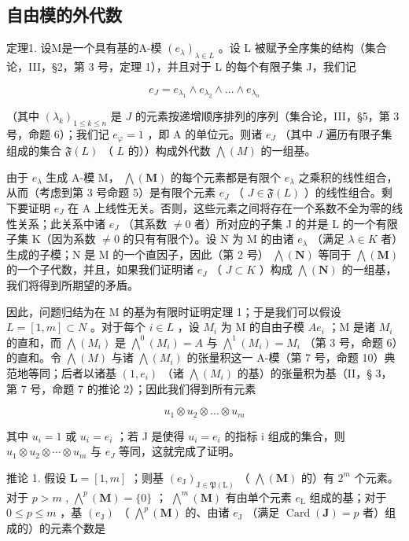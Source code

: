 \subsection{自由模的外代数}

定理1. 设M是一个具有基的A-模 \((e_{\lambda})_{\lambda \in L}\) 。设 L 被赋予全序集的结构（集合论，III，§2，第 3 号，定理 1），并且对于 L 的每个有限子集 J，我们记

\[
e _ {J} = e _ {\lambda_ {1}} \wedge e _ {\lambda_ {2}} \wedge \dots \wedge e _ {\lambda_ {n}}\tag{18}
\]

（其中 \((\lambda_k)_{1 \leqslant k \leqslant n}\) 是 \(J\) 的元素按递增顺序排列的序列（集合论，III，§5，第 3 号，命题 6）；我们记 \(e_\varphi = 1\) ，即 A 的单位元。则诸 \(e_J\) （其中 \(J\) 遍历有限子集组成的集合 \(\mathfrak{F}(L)\) （ \(L\) 的））构成外代数 \(\bigwedge(M)\) 的一组基。

由于 \(e_{\lambda}\) 生成 A-模 M， \(\bigwedge(\mathbf{M})\) 的每个元素都是有限个 \(e_{\lambda}\) 之乘积的线性组合，从而（考虑到第 3 号命题 5）是有限个元素 \(e_{J}\) （ \(J \in \mathfrak{F}(L)\) ）的线性组合。剩下要证明 \(e_{J}\) 在 A 上线性无关。否则，这些元素之间将存在一个系数不全为零的线性关系；此关系中诸 \(e_{J}\) （其系数 \(\neq 0\) 者）所对应的子集 J 的并是 L 的一个有限子集 K（因为系数 \(\neq 0\) 的只有有限个）。设 N 为 M 的由诸 \(e_{\lambda}\) （满足 \(\lambda \in K\) 者）生成的子模；N 是 M 的一个直因子，因此（第 2 号） \(\bigwedge(\mathbf{N})\) 等同于 \(\bigwedge(\mathbf{M})\) 的一个子代数，并且，如果我们证明诸 \(e_{J}\) （ \(J \subset K\) ）构成 \(\bigwedge(\mathbf{N})\) 的一组基，我们将得到所期望的矛盾。

因此，问题归结为在 M 的基为有限时证明定理 1；于是我们可以假设 \(L = [1, m] \subset N\) 。对于每个 \(i \in L\) ，设 \(M_i\) 为 M 的自由子模 \(Ae_i\) ；M 是诸 \(M_i\) 的直和，而 \(\bigwedge(M_i)\) 是 \(\bigwedge^0(M_i) = A\) 与 \(\bigwedge^1(M_i) = M_i\) （第 3 号，命题 6）的直和。令 \(\bigwedge(M)\) 与诸 \(\bigwedge(M_i)\) 的张量积这一 A-模（第 7 号，命题 10）典范地等同；后者以诸基 \((1, e_i)\) （诸 \(\bigwedge(M_i)\) 的基）的张量积为基（II，§ 3，第 7 号，命题 7 的推论 2）；因此我们得到所有元素

\[
u _ {1} \otimes u _ {2} \otimes \dots \otimes u _ {m}
\]

其中 \(u_{i}=1\) 或 \(u_{i}=e_{i}\) ；若 J 是使得 \(u_{i}=e_{i}\) 的指标 i 组成的集合，则 \(u_{1}\otimes u_{2}\otimes\cdots\otimes u_{m}\) 与 \(e_{J}\) 等同，这就完成了证明。

推论 1. 假设 \(\mathbf{L} = [1, m]\) ；则基 \((e_{\mathrm{J}})_{\mathrm{J} \in \mathfrak{P}(\mathrm{L})}\) （ \(\bigwedge (\mathbf{M})\) 的）有 \(2^{m}\) 个元素。对于 \(p > m\) , \(\bigwedge^{p}(\mathbf{M}) = \{0\}\) ； \(\bigwedge^{m}(\mathbf{M})\) 有由单个元素 \(e_{\mathrm{L}}\) 组成的基；对于 \(0 \leqslant p \leqslant m\) ，基 \((e_{\mathrm{J}})\) （ \(\bigwedge^{p}(\mathbf{M})\) 的、由诸 \(e_{\mathrm{J}}\) （满足 \(\operatorname{Card}(\mathbf{J}) = p\) 者）组成的）的元素个数是


